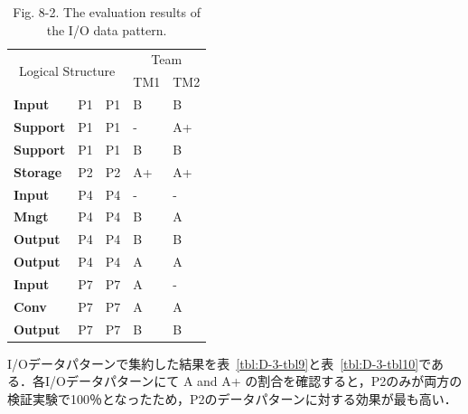 \documentclass[a4paper,12pt]{jreport}
\begin{document}
\begin{table}[htbp]
  \centering
  \caption{Fig. 8-2. The evaluation results of the I/O data pattern.}
    \begin{tabular}{|l|l|l|l|l|}
    \hline
    \multicolumn{3}{|c|}{\multirow{2}[4]{*}{Logical
Structure}} & \multicolumn{2}{c|}{Team} \bigstrut\\
\cline{4-5}    \multicolumn{3}{|c|}{} & TM1   & TM2 \bigstrut\\
    \hline
    \textbf{Input} & P1    & P1    & B     & B \bigstrut\\
    \hline
    \textbf{Support} & P1    & P1    & -     & A+ \bigstrut\\
    \hline
    \textbf{Support} & P1    & P1    & B     & B \bigstrut\\
    \hline
    \textbf{Storage} & P2    & P2    & A+    & A+ \bigstrut\\
    \hline
    \textbf{Input} & P4    & P4    & -     & - \bigstrut\\
    \hline
    \textbf{Mngt} & P4    & P4    & B     & A \bigstrut\\
    \hline
    \textbf{Output} & P4    & P4    & B     & B \bigstrut\\
    \hline
    \textbf{Output} & P4    & P4    & A     & A \bigstrut\\
    \hline
    \textbf{Input} & P7    & P7    & A     & - \bigstrut\\
    \hline
    \textbf{Conv} & P7    & P7    & A     & A \bigstrut\\
    \hline
    \textbf{Output} & P7    & P7    & B     & B \bigstrut\\
    \hline
    \end{tabular}%
  \label{tbl:D-3-tbl8}%
\end{table}%

I/Oデータパターンで集約した結果を表~\ref{tbl:D-3-tbl9}と表~\ref{tbl:D-3-tbl10}である．各I/Oデータパターンにて A and A+ の割合を確認すると，P2のみが両方の検証実験で100％となったため，P2のデータパターンに対する効果が最も高い．
\end{document}
